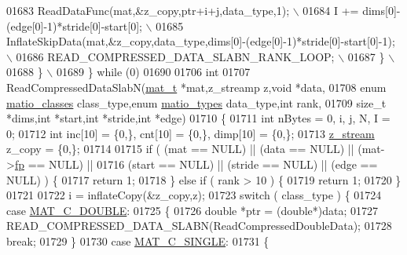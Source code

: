\begin{DoxyCode}
{{{{{{{{{01683 \textcolor{preprocessor}{                ReadDataFunc(mat,&z\_copy,ptr+i+j,data\_type,1); \(\backslash\)}
01684 \textcolor{preprocessor}{                I += dims[0]-(edge[0]-1)*stride[0]-start[0]; \(\backslash\)}
01685 \textcolor{preprocessor}{                InflateSkipData(mat,&z\_copy,data\_type,dims[0]-(edge[0]-1)*stride[0]-start[0]-1); \(\backslash\)}
01686 \textcolor{preprocessor}{                READ\_COMPRESSED\_DATA\_SLABN\_RANK\_LOOP; \(\backslash\)}
01687 \textcolor{preprocessor}{            \} \(\backslash\)}
01688 \textcolor{preprocessor}{        \} \(\backslash\)}
01689 \textcolor{preprocessor}{    \} while (0)}
01690 
01706 \textcolor{keywordtype}{int}
01707 ReadCompressedDataSlabN(\hyperlink{struct__mat__t}{mat\_t} *mat,z\_streamp z,\textcolor{keywordtype}{void} *data,
01708     \textcolor{keyword}{enum} \hyperlink{group___m_a_t_gad4d60ae7b709fc81bfd744fb4c857c40}{matio\_classes} class\_type,\textcolor{keyword}{enum} \hyperlink{group___m_a_t_gacf7b3b879282b7ab3a51190e49bf3453}{matio\_types} data\_type,\textcolor{keywordtype}{int} rank,
01709     \textcolor{keywordtype}{size\_t} *dims,\textcolor{keywordtype}{int} *start,\textcolor{keywordtype}{int} *stride,\textcolor{keywordtype}{int} *edge)
01710 \{
01711     \textcolor{keywordtype}{int} nBytes = 0, i, j, N, I = 0;
01712     \textcolor{keywordtype}{int} inc[10] = \{0,\}, cnt[10] = \{0,\}, dimp[10] = \{0,\};
01713     \hyperlink{structz__stream__s}{z\_stream} z\_copy = \{0,\};
01714 
01715     \textcolor{keywordflow}{if} ( (mat   == NULL) || (data   == NULL) || (mat->\hyperlink{struct__mat__t_a85f562e407ca9ad4d2a6e14f839432b7}{fp} == NULL) ||
01716          (start == NULL) || (stride == NULL) || (edge    == NULL) ) \{
01717         \textcolor{keywordflow}{return} 1;
01718     \} \textcolor{keywordflow}{else} \textcolor{keywordflow}{if} ( rank > 10 ) \{
01719         \textcolor{keywordflow}{return} 1;
01720     \}
01721 
01722     i = inflateCopy(&z\_copy,z);
01723     \textcolor{keywordflow}{switch} ( class\_type ) \{
01724         \textcolor{keywordflow}{case} \hyperlink{group___m_a_t_ggad4d60ae7b709fc81bfd744fb4c857c40a5d70e0862e5bdb7bd86bf7ba5948f307}{MAT\_C\_DOUBLE}:
01725         \{
01726             \textcolor{keywordtype}{double} *ptr = (\textcolor{keywordtype}{double}*)data;
01727             READ\_COMPRESSED\_DATA\_SLABN(ReadCompressedDoubleData);
01728             \textcolor{keywordflow}{break};
01729         \}
01730         \textcolor{keywordflow}{case} \hyperlink{group___m_a_t_ggad4d60ae7b709fc81bfd744fb4c857c40a2825631e26a961cbe0f79db50a39cea2}{MAT\_C\_SINGLE}:
01731         \{
}}}}}}}}}
\end{DoxyCode}
